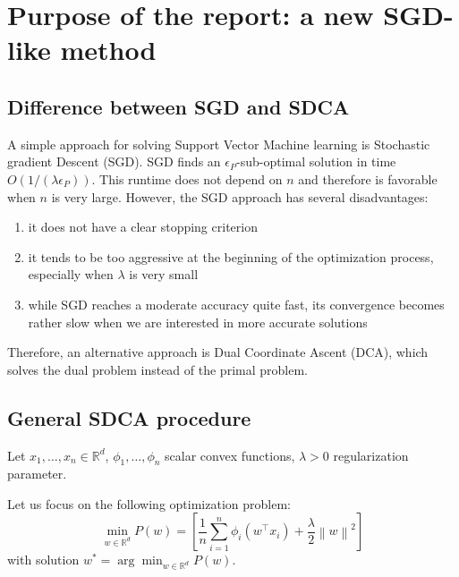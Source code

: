 \documentclass{article}
\newcommand{\norm}[1]{\left\|#1 \right\|}
\begin{document}
\section{Purpose of the report: a new SGD-like method}

\subsection{Difference between SGD and SDCA}


\hspace{2em}
A simple approach for solving Support Vector Machine learning is Stochastic gradient Descent (SGD).
SGD finds an $\epsilon_P$-sub-optimal solution in time $O(1/(\lambda \epsilon_P))$.
This runtime does not depend on $n$ and therefore is favorable when $n$ is very large.
However, the SGD approach has several disadvantages:

\begin{enumerate}
    \item it does not have a clear stopping criterion
    \item it tends to be too aggressive at the beginning of the optimization process, especially when $\lambda$ is very small
    \item while SGD reaches a moderate accuracy quite fast, its convergence becomes rather slow when we are interested in more accurate solutions
\end{enumerate}

\hspace{2em}
Therefore, an alternative approach is Dual Coordinate Ascent (DCA), which solves the dual problem instead of the primal problem.

\subsection{General SDCA procedure}

Let $x_1, \dots, x_n \in \mathbb{R}^d$, $\phi_1, \dots, \phi_n$ scalar convex functions, $\lambda > 0$ regularization parameter.

Let us focus on the following optimization problem:
\begin{equation}
    \min_{w \in \mathbb{R}^d} P(w) = \left[ \dfrac{1}{n} \sum_{i=1}^n \phi_i(w^\top x_i) + \dfrac{\lambda}{2}\norm{w}^2 \right]
    \label{primal}
\end{equation}
with solution $w^{*} = \arg \min_{w \in \mathbb{R}^d} P(w)$.
\end{document}
